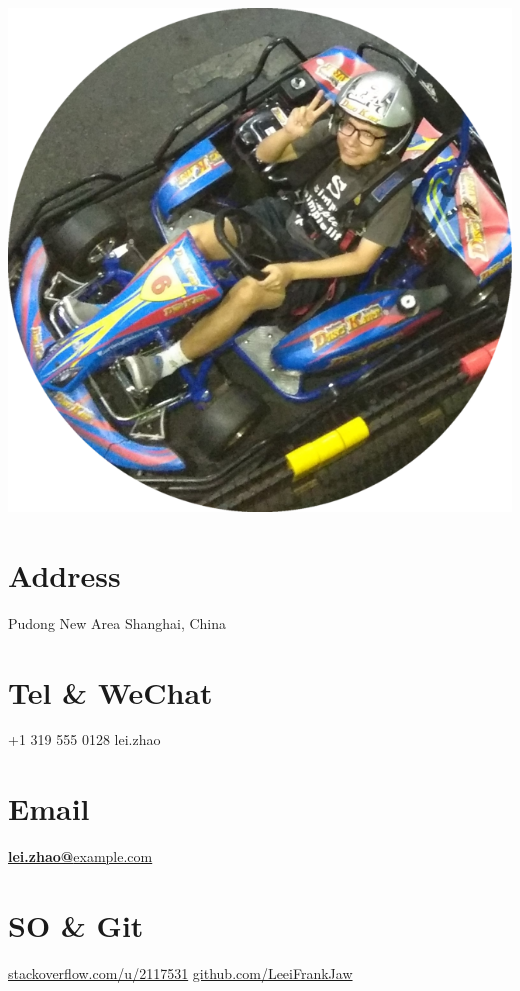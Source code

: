 \documentclass[a4paper]{friggeri-cv}
\begin{document}
      

\begin{aside}
  \includegraphics[scale=0.18]{img/zhao_circle.png}
  \section{Address}
  Pudong New Area
  Shanghai, China
  ~
  \section{Tel \& WeChat}
  +1 319 555 0128
  lei.zhao
  ~
  \section{Email}
  \href{mailto:lei.zhao@example.com}{\textbf{lei.zhao@}example.com}
  ~
  \section{SO \& Git}
  \href{https://stackoverflow.com/users/2117531/lei-zhao}{stackoverflow.com/u/2117531}
  \href{https://github.com/LeeiFrankJaw}{github.com/LeeiFrankJaw}
  ~

\end{aside}
\end{document}
